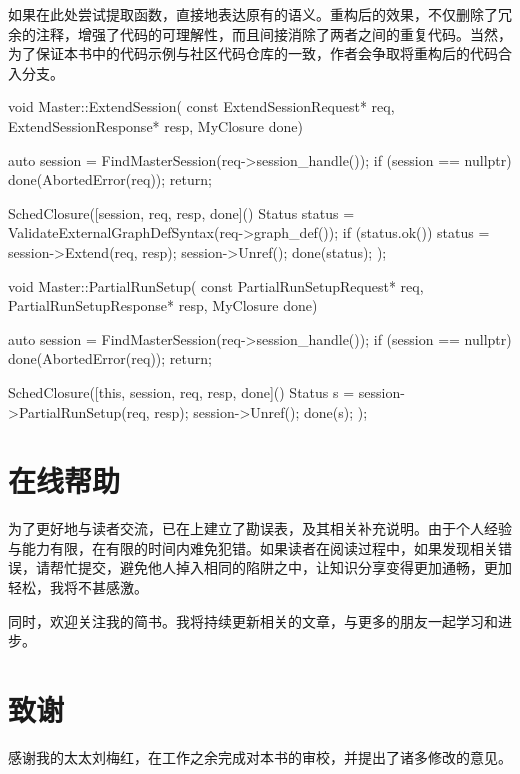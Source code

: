 \begin{content}
如果在此处尝试提取函数，直接地表达原有的语义。重构后的效果，不仅删除了冗余的注释，增强了代码的可理解性，而且间接消除了两者之间的重复代码。当然，为了保证本书中的代码示例与社区代码仓库的一致，作者会争取将重构后的代码合入分支。

\begin{leftbar}
\begin{c++}
void Master::ExtendSession(
    const ExtendSessionRequest* req,
    ExtendSessionResponse* resp, MyClosure done) {
  auto session = FindMasterSession(req->session_handle());
  if (session == nullptr) {
    done(AbortedError(req));
    return;
  }

  SchedClosure([session, req, resp, done]() {
    Status status = ValidateExternalGraphDefSyntax(req->graph_def());
    if (status.ok()) {
      status = session->Extend(req, resp);
    }
    session->Unref();
    done(status);
  });
}

void Master::PartialRunSetup(
    const PartialRunSetupRequest* req,
    PartialRunSetupResponse* resp, MyClosure done) {
  auto session = FindMasterSession(req->session_handle());
  if (session == nullptr) {
    done(AbortedError(req));
    return;
  }

  SchedClosure([this, session, req, resp, done]() {
    Status s = session->PartialRunSetup(req, resp);
    session->Unref();
    done(s);
  });
}
\end{c++}
\end{leftbar}

\end{content}

\section*{在线帮助}

\begin{content}

为了更好地与读者交流，已在上建立了勘误表，及其相关补充说明。由于个人经验与能力有限，在有限的时间内难免犯错。如果读者在阅读过程中，如果发现相关错误，请帮忙提交，避免他人掉入相同的陷阱之中，让知识分享变得更加通畅，更加轻松，我将不甚感激。

同时，欢迎关注我的简书。我将持续更新相关的文章，与更多的朋友一起学习和进步。

\begin{enum}
\end{enum}

\end{content}

\section*{致谢}

\begin{content}

感谢我的太太刘梅红，在工作之余完成对本书的审校，并提出了诸多修改的意见。

\end{content}
